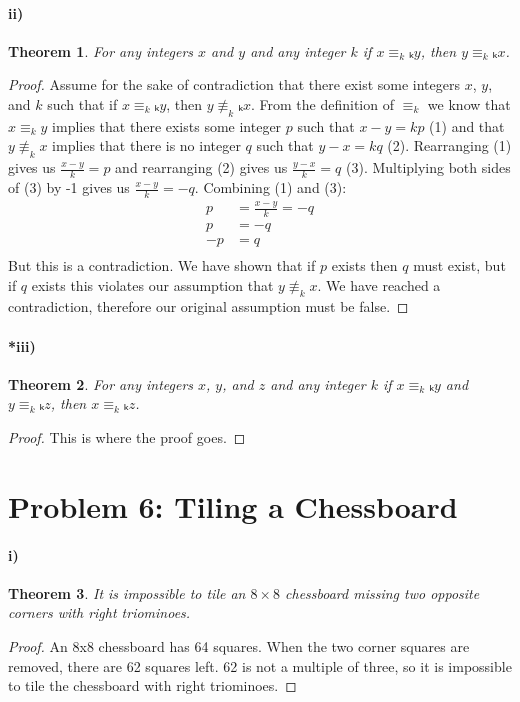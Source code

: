 \documentclass[10pt,letter]{article}
\newtheorem*{thm}{Theorem}
\begin{document}
\paragraph{ii)}
\begin{thm}
  For any integers $x$ and $y$ and any integer $k$ if $x \equiv_kₖ y$, then $y \equiv_kₖ x$.
\end{thm}
\begin{proof}
  Assume for the sake of contradiction that there exist some integers $x$, $y$, and $k$ such that if $x \equiv_kₖ y$, then $y \not \equiv_kₖ x$. From the definition of $\equiv_k$ we know that $x \equiv_k y$ implies that there exists some integer $p$ such that $x - y = kp$ (1) and that $y \not \equiv_k x$ implies that there is no integer $q$ such that $y - x = kq$ (2). Rearranging (1) gives us $\frac{x-y}{k} = p$ and rearranging (2) gives us $\frac{y-x}{k} = q$ (3). Multiplying both sides of (3) by -1 gives us $\frac{x-y}{k} = -q$. Combining (1) and (3):
  \begin{align*}
    p &= \frac{x-y}{k} = -q\\
    p &= -q\\
    -p &= q\\
  \end{align*}
  But this is a contradiction. We have shown that if $p$ exists then $q$ must exist, but if $q$ exists this violates our assumption that $y \not \equiv_k x$. We have reached a contradiction, therefore our original assumption must be false.
\end{proof}
       
\paragraph{*iii)}
\begin{thm}
  For any integers $x$, $y$, and $z$ and any integer $k$ if $x \equiv_kₖ y$ and $y \equiv_kₖ z$, then $x \equiv_kₖ z$.
\end{thm}
\begin{proof}
  This is where the proof goes.
\end{proof}

\section*{Problem 6: Tiling a Chessboard}
\paragraph{i)}
\begin{thm} It is impossible to tile an $8 \times 8$ chessboard missing two opposite corners with right triominoes.
\end{thm}
\begin{proof}
  An 8x8 chessboard has 64 squares. When the two corner squares are removed, there are 62 squares left. 62 is not a multiple of three, so it is impossible to tile the chessboard with right triominoes.
\end{proof}
\end{document}
